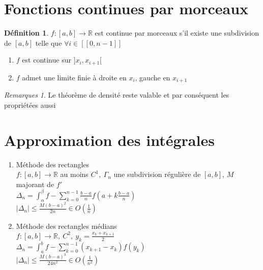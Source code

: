 \documentclass[fleqn]{article}
\theoremstyle{definition} \newtheorem*{defi}{D\'efinition}
\theoremstyle{definition} \newtheorem*{theo}{Th\'eor\`eme}
\theoremstyle{definition} \newtheorem*{coro}{Corollaire}
\theoremstyle{remark} \newtheorem*{rqs}{Remarques}
\theoremstyle{definition} \newtheorem*{prop}{Propri\'et\'e}
\begin{document}
\section{Fonctions continues par morceaux}
\begin{defi}
	$f:[a,b] \rightarrow \mathbb{R}$ est continue par morceaux s'il existe une subdivision de $[a,b]$ telle que $\forall i \in [\![0,n-1]\!]$
	\begin{enumerate}
		\item $f$ est continue sur $]x_i, x_{i+1}[$
		\item $f$ admet une limite finie \`a droite en $x_i$, gauche en $x_{i+1}$
	\end{enumerate}
\end{defi}

\begin{rqs}
	Le th\'eor\`eme de densit\'e reste valable et par cons\'equent les propri\'et\'ees aussi
\end{rqs}

\section{Approximation des int\'egrales}
\begin{enumerate}
	\item M\'ethode des rectangles \\
		$f:[a,b] \rightarrow \mathbb{R}$ au moins $C^1,\ \Gamma_n$ une subdivision r\'eguli\`ere de $[a,b]$, $M$ majorant de $f'$ \\
		$\Delta_n = \int_\alpha^\beta f - \sum_{k=0}^{n-1} \frac{b-a}{n} f(a + k\frac{b-a}{n})$ \\
		$|\Delta_n| \leq \frac{M(b-a)^2}{2n} \in O(\frac{1}{n})$
	\item M\'ethode des rectangles m\'edians \\
		$f:[a,b] \rightarrow \mathbb{R},\ C^2,\ y_k = \frac{x_k + x_{k+1}}{2}$ \\
		$\Delta_n = \int_a^b f - \sum_{k=0}^{n-1} (x_{k+1} - x_k)f(y_k)$ \\
		$|\Delta_n| \leq \frac{M(b-a)^3}{24n^2} \in O(\frac{1}{n^2})$

\end{enumerate}
\end{document}
